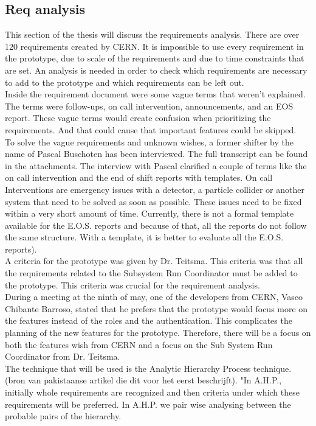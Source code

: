 \documentclass[paper=a4, fontsize=11pt,twoside]{scrartcl}	%
\begin{document}
\subsection{Req analysis}
This section of the thesis will discuss the requirements analysis. There are over 120 requirements created by CERN. It is impossible to use every requirement in the prototype, due to scale of the requirements and due to time constraints that are set. An analysis is needed in order to check which requirements are necessary to add to the prototype and which requirements can be left out.  \\
Inside the requirement document were some vague terms that weren't explained. The terms were follow-ups, on call intervention, announcements, and an EOS report. These vague terms would create confusion when prioritizing the requirements. And that could cause that important features could be skipped. \\
To solve the vague requirements and unknown wishes, a former shifter by the name of Pascal Buschoten has been interviewed. The full transcript can be found in the attachments. The interview with Pascal clarified a couple of terms like the on call intervention and the end of shift reports with templates. On call Interventions are emergency issues with a detector, a particle collider or another system that need to be solved as soon as possible. These issues need to be fixed within a very short amount of time. Currently, there is not a formal template available for the E.O.S. reports  and because of that, all the reports do not follow the same structure. With a template, it is better to evaluate all the E.O.S. reports).\\
A criteria for the prototype was given by Dr. Teitsma. This criteria was that all the requirements related to the Subsystem Run Coordinator must be added to the prototype. This criteria was crucial for the requirement analysis. \\
During a meeting at the ninth of may, one of the developers from CERN, Vasco Chibante Barroso, stated that he prefers that the prototype would focus more on the features instead of the roles and the authentication. This complicates the planning of the new features for the prototype. Therefore, there will be a focus on both the features wish from CERN and a focus on the Sub System Run Coordinator from Dr. Teitsma. \\ 
The technique that will be used is the Analytic Hierarchy Process technique.(bron van pakistaanse artikel die dit voor het eerst beschrijft). "In A.H.P., initially whole requirements are recognized and then criteria under which these requirements will be preferred. In A.H.P. we pair wise analysing  between  the  probable  pairs  of  the  hierarchy. 
\end{document}
